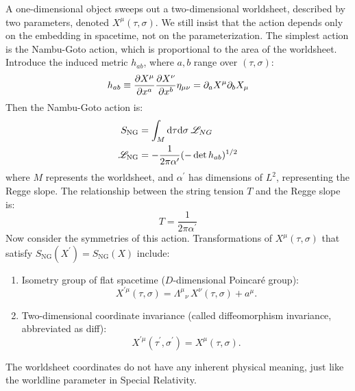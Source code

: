 A one-dimensional object sweeps out a two-dimensional worldsheet, described by two parameters, denoted $X^\mu(\tau, \sigma)$. We still insist that the action depends only on the embedding in spacetime, not on the parameterization. The simplest action is the Nambu-Goto action, which is proportional to the area of the worldsheet. 
Introduce the induced metric $h_{ab}$, where $a,b$ range over $(\tau, \sigma)$: 
\begin{equation}
	h_{ab}\equiv\pdv{X^{\mu}}{x^a}\pdv{X^{\nu}}{x^b}\eta_{\mu\nu}=\partial_a X^\mu\partial_b X_\mu
\end{equation}
Then the Nambu-Goto action is: 
\begin{subequations} \label{1.2.9} %
	\begin{align}
		S_{\mathrm{NG}}&=\int_M \mathrm{d}\tau \mathrm{d}\sigma\: \mathscr{L}_{NG} \\
		\mathscr{L}_{\mathrm{NG}}&=-\frac{1}{2\pi\alpha^\prime}(-\det h_{ab})^{1/2}
	\end{align} 
\end{subequations}
where $M$ represents the worldsheet, and $\alpha^\prime$ has dimensions of $L^2$, representing the Regge slope. The relationship between the string tension $T$ and the Regge slope is: 
\begin{equation}
	T=\frac{1}{2\pi\alpha^\prime}
\end{equation}
Now consider the symmetries of this action. 
Transformations of $X^\mu(\tau, \sigma)$ that satisfy $S_{\mathrm{NG}}(X^\prime)=S_{\mathrm{NG}}(X)$ include: 
\begin{enumerate}
	\item Isometry group of flat spacetime ($D$-dimensional Poincaré group): 
	\begin{equation}
		X^{\prime \mu}(\tau,\sigma)=\Lambda^{\mu}{}_{\nu} \,X^\nu(\tau,\sigma)+a^\mu.
	\end{equation} 
	\item Two-dimensional coordinate invariance (called diffeomorphism invariance, abbreviated as diff): 
	\begin{equation}
		X^{\prime \mu}(\tau^\prime,\sigma^\prime)=X^{\mu}(\tau,\sigma).
		\label{diffeomorphism}
	\end{equation} 
\end{enumerate}
\begin{tcolorbox}[breakable]
	\begin{remark}
		The worldsheet coordinates do not have any inherent physical meaning, just like the worldline parameter in Special Relativity.
	\end{remark}
\end{tcolorbox}
